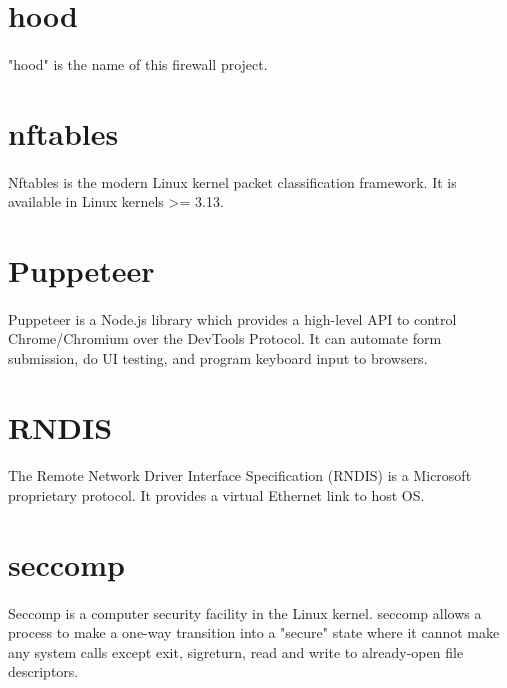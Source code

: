 \documentclass[mscthesis]{usiinfthesis}
\begin{document}
\section{hood}\label{sec:hood}
\paragraph{}
"hood" is the name of this firewall project.

\section{nftables}\label{sec:nftables}
\paragraph{}
Nftables is the modern Linux kernel packet classification framework. It is available in Linux kernels >= 3.13.

\section{Puppeteer}\label{sec:Puppeteer}
\paragraph{}
Puppeteer is a Node.js library which provides a high-level API to control Chrome/Chromium over the DevTools Protocol. It can automate form submission, do UI testing, and program keyboard input to browsers.

\section{RNDIS}\label{sec:RNDIS}
\paragraph{}
The Remote Network Driver Interface Specification (RNDIS) is a Microsoft proprietary protocol. It provides a virtual Ethernet link to host OS.

\section{seccomp}\label{sec:seccomp}
\paragraph{}
Seccomp is a computer security facility in the Linux kernel. seccomp allows a process to make a one-way transition into a "secure" state where it cannot make any system calls except exit, sigreturn, read and write to already-open file descriptors.
\end{document}
